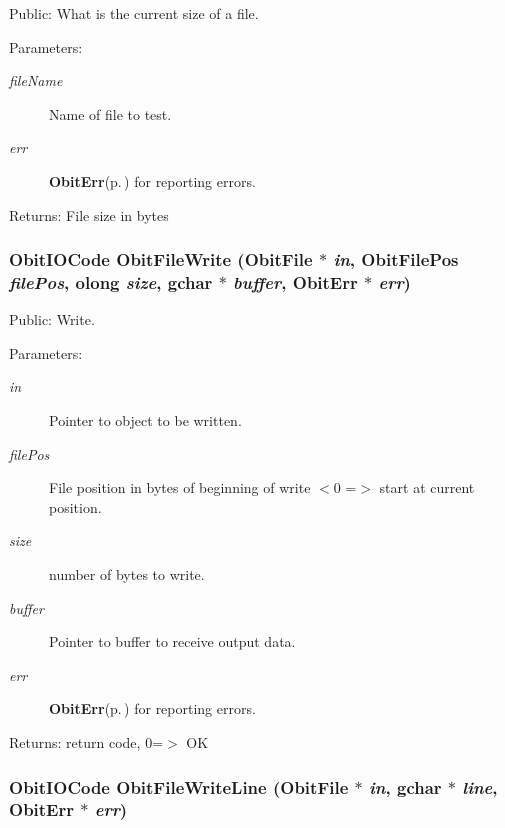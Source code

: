 Public: What is the current size of a file. 

\begin{Desc}
\item[Parameters:]
\begin{description}
\item[{\em file\-Name}]Name of file to test. \item[{\em err}]{\bf Obit\-Err}{\rm (p.\,\pageref{structObitErr})} for reporting errors. \end{description}
\end{Desc}
\begin{Desc}
\item[Returns:]File size in bytes \end{Desc}
\subsubsection{\setlength{\rightskip}{0pt plus 5cm}Obit\-IOCode Obit\-File\-Write ({\bf Obit\-File} $\ast$ {\em in}, {\bf Obit\-File\-Pos} {\em file\-Pos}, {\bf olong} {\em size}, gchar $\ast$ {\em buffer}, {\bf Obit\-Err} $\ast$ {\em err})}\label{ObitFile_8h_a35}


Public: Write. 

\begin{Desc}
\item[Parameters:]
\begin{description}
\item[{\em in}]Pointer to object to be written. \item[{\em file\-Pos}]File position in bytes of beginning of write $<$0 =$>$ start at current position. \item[{\em size}]number of bytes to write. \item[{\em buffer}]Pointer to buffer to receive output data. \item[{\em err}]{\bf Obit\-Err}{\rm (p.\,\pageref{structObitErr})} for reporting errors. \end{description}
\end{Desc}
\begin{Desc}
\item[Returns:]return code, 0=$>$ OK \end{Desc}
\subsubsection{\setlength{\rightskip}{0pt plus 5cm}Obit\-IOCode Obit\-File\-Write\-Line ({\bf Obit\-File} $\ast$ {\em in}, gchar $\ast$ {\em line}, {\bf Obit\-Err} $\ast$ {\em err})}\label{ObitFile_8h_a36}


